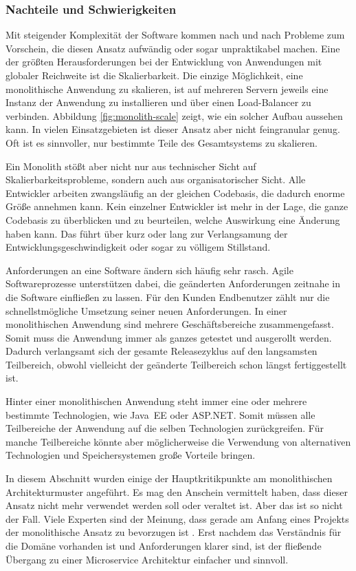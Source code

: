 \subsubsection{Nachteile und Schwierigkeiten}
\label{subsubsec:microservices-disadvantages}

Mit steigender Komplexität der Software kommen nach und nach Probleme zum Vorschein, die diesen Ansatz aufwändig oder sogar unpraktikabel machen. Eine der größten Herausforderungen bei der Entwicklung von Anwendungen mit globaler Reichweite ist die Skalierbarkeit. Die einzige Möglichkeit, eine monolithische Anwendung zu skalieren, ist auf mehreren Servern jeweils eine Instanz der Anwendung zu installieren und über einen Load-Balancer zu verbinden. Abbildung \ref{fig:monolith-scale} zeigt, wie ein solcher Aufbau aussehen kann. In vielen Einsatzgebieten ist dieser Ansatz aber nicht feingranular genug. Oft ist es sinnvoller, nur bestimmte Teile des Gesamtsystems zu skalieren.

Ein Monolith stößt aber nicht nur aus technischer Sicht auf Skalierbarkeitsprobleme, sondern auch aus organisatorischer Sicht. Alle Entwickler arbeiten zwangsläufig an der gleichen Codebasis, die dadurch enorme Größe annehmen kann. Kein einzelner Entwickler ist mehr in der Lage, die ganze Codebasis zu überblicken und zu beurteilen, welche Auswirkung eine Änderung haben kann. Das führt über kurz oder lang zur Verlangsamung der Entwicklungsgeschwindigkeit oder sogar zu völligem Stillstand.

Anforderungen an eine Software ändern sich häufig sehr rasch. Agile Softwareprozesse unterstützen dabei, die geänderten Anforderungen zeitnahe in die Software einfließen zu lassen. Für den Kunden \bzw Endbenutzer zählt nur die schnellstmögliche Umsetzung seiner neuen Anforderungen. In einer monolithischen Anwendung sind mehrere Geschäftsbereiche zusammengefasst. Somit muss die Anwendung immer als ganzes getestet und ausgerollt werden. Dadurch verlangsamt sich der gesamte Releasezyklus auf den langsamsten Teilbereich, obwohl vielleicht der geänderte Teilbereich schon längst fertiggestellt ist.

Hinter einer monolithischen Anwendung steht immer eine oder mehrere bestimmte Technologien, wie \zB \mbox{Java EE} oder ASP.NET. Somit müssen alle Teilbereiche der Anwendung auf die selben Technologien zurückgreifen. Für manche Teilbereiche könnte aber möglicherweise die Verwendung von alternativen Technologien und Speichersystemen große Vorteile bringen.

In diesem Abschnitt wurden einige der Hauptkritikpunkte am monolithischen Architekturmuster angeführt. Es mag den Anschein vermittelt haben, dass dieser Ansatz nicht mehr verwendet werden soll oder veraltet ist. Aber das ist so nicht der Fall. Viele Experten sind der Meinung, dass gerade am Anfang eines Projekts der monolithische Ansatz zu bevorzugen ist \cite{FowlerMolithFirst}. Erst nachdem das Verständnis für die Domäne vorhanden ist und Anforderungen klarer sind, ist der fließende Übergang zu einer Microservice Architektur einfacher und sinnvoll. 

